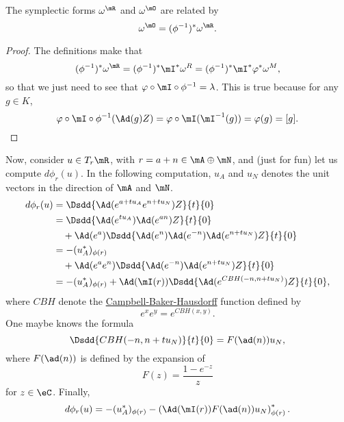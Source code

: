 \begin{lemma}\label{lem:om_O_om_R}
The symplectic forms $\omega^{\mR}$ and $\omega^{\mO}$ are related by
\begin{equation}
\omega^{\mO}=(\phi^{-1})^*\omega^{\mR}.
\end{equation}
\end{lemma}

\begin{proof}
The definitions make that
\begin{equation}
  (\phi^{-1})^*\omega^{\mR}=(\phi^{-1})^*\mI^*\omega^R
                          =(\phi^{-1})^*\mI^*\varphi^*\omega^M,
\end{equation}
so that we just need to see that $\varphi\circ\mI\circ\phi^{-1}=\lambda$. This is true because for any $g\in K$,
\[
   \varphi\circ\mI\circ\phi^{-1}(\Ad(g)Z)=\varphi\circ\mI(\mI^{-1}(g))=\varphi(g)=[g].
\]

\end{proof}

Now, consider $u\in T_r\mR$, with $r=a+n\in\mA\oplus\mN$, and (just for fun) let us compute $d\phi_r(u)$. In the following computation, $u_A$ and $u_N$ denotes the unit vectors in the direction of $\mA$ and $\mN$.
\begin{equation}
\begin{split}
   d\phi_r(u)&=\Dsdd{  \Ad(e^{a+tu_A}e^{n+tu_N})Z  }{t}{0}\\
             &=\Dsdd{ \Ad(e^{tu_A})\Ad(e^{an})Z  }{t}{0}\\
             &\quad+\Ad(e^a)\Dsdd{  \Ad(e^n)\Ad(e^{-n})\Ad(e^{n+tu_N})Z  }{t}{0}\\
	     &=-(u_A^*)_{\phi(r)}\\
	     &\quad+\Ad(e^ae^n)\Dsdd{ \Ad(e^{-n})\Ad( e^{n+tu_N} )Z  }{t}{0}\\
	     &=-(u_A^*)_{\phi(r)}+\Ad(\mI(r))\Dsdd{  \Ad(e^{ CBH(-n,n+tu_N) })Z  }{t}{0},
\end{split}
\end{equation}
where $CBH$ denote the \href{http://en.wikipedia.org/wiki/Baker-Campbell-Hausdorff_formula}{Campbell-Baker-Hausdorff} function defined by
\[
   e^xe^y=e^{CBH(x,y)}.
\]
One maybe knows the formula
\begin{equation}
\Dsdd{  CBH(-n,n+tu_N)  }{t}{0}=F(\ad(n))u_N,
\end{equation}
where $F(\ad(n))$ is defined by the expansion of
\[
F(z)=\frac{1-e^{-z}}{z}
\]
for $z\in\eC$. Finally,
\begin{equation}
d\phi_r(u)=-(u_A^*)_{\phi(r)}-\left(  \Ad(\mI(r))F(\ad(n))u_N  \right)^*_{\phi(r)}.
\end{equation}

